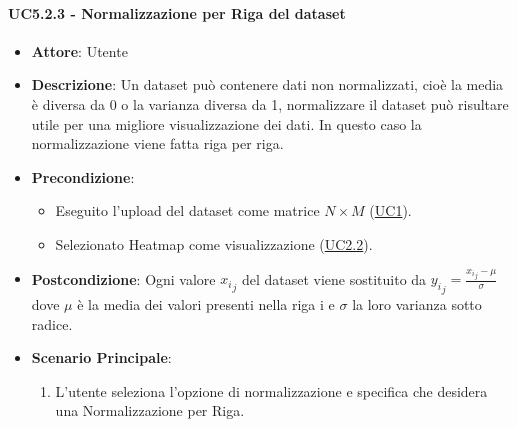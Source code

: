     \paragraph{UC5.2.3 - Normalizzazione per Riga del dataset}
    \label{uc5.2.3}
    \begin{itemize}
    \item \textbf{Attore}: Utente
    \item \textbf{Descrizione}: Un dataset può contenere dati non normalizzati, cioè la media è diversa da 0 o la varianza diversa da 1, normalizzare il dataset può risultare utile per una migliore visualizzazione dei dati.
    In questo caso la normalizzazione viene fatta riga per riga.
    \item \textbf{Precondizione}: 
    \begin{itemize}
        \item Eseguito l'upload del dataset come matrice $N\times M$ (\hyperref[uc1]{UC1}).
        \item Selezionato Heatmap come visualizzazione (\hyperref[uc2.2]{UC2.2}).
    \end{itemize}  
    \item \textbf{Postcondizione}:  Ogni valore ${x_i}_j$ del dataset viene sostituito da $ {y_i}_j = \frac{{x_i}_j - \mu}{\sigma}$ dove $\mu$ è la media dei valori presenti nella riga i e $\sigma$ la loro varianza sotto radice.
    \item \textbf{Scenario Principale}: 
    \begin{enumerate}
        \item L'utente seleziona l'opzione di normalizzazione e specifica che desidera una Normalizzazione per Riga. 
    \end{enumerate}  
    \end{itemize}
    
